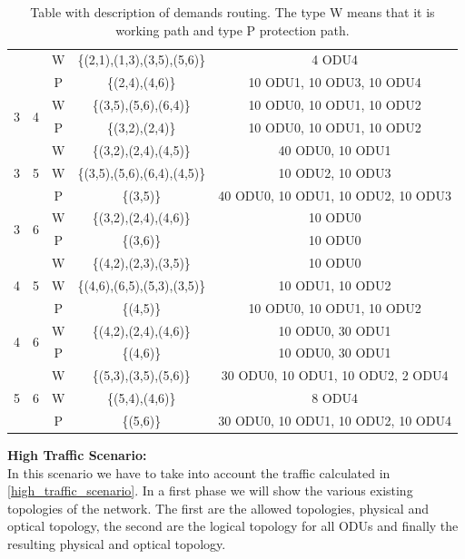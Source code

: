 \begin{table}[h]
\begin{tabular}{||c|c|c|c|c||}
  & &W& \{(2,1),(1,3),(3,5),(5,6)\} & 4 ODU4 \\
  & &P& \{(2,4),(4,6)\} & 10 ODU1, 10 ODU3, 10 ODU4 \\ \hline
 \multirow{2}{*}{3} & \multirow{2}{*}{4}&W& \{(3,5),(5,6),(6,4)\} & 10 ODU0, 10 ODU1, 10 ODU2 \\
  & &P& \{(3,2),(2,4)\} & 10 ODU0, 10 ODU1, 10 ODU2 \\ \hline
 \multirow{3}{*}{3}&\multirow{3}{*}{5}&W&\{(3,2),(2,4),(4,5)\}&40 ODU0, 10 ODU1 \\
  & &W& \{(3,5),(5,6),(6,4),(4,5)\}& 10 ODU2, 10 ODU3\\
  & &P& \{(3,5)\} & 40 ODU0, 10 ODU1, 10 ODU2, 10 ODU3 \\ \hline
 \multirow{2}{*}{3} & \multirow{2}{*}{6}&W& \{(3,2),(2,4),(4,6)\} & 10 ODU0 \\
  & &P& \{(3,6)\} & 10 ODU0 \\ \hline
 \multirow{3}{*}{4} & \multirow{3}{*}{5}&W& \{(4,2),(2,3),(3,5)\} & 10 ODU0 \\
  & &W& \{(4,6),(6,5),(5,3),(3,5)\} & 10 ODU1, 10 ODU2 \\
  & &P& \{(4,5)\} & 10 ODU0, 10 ODU1, 10 ODU2 \\ \hline
 \multirow{2}{*}{4} & \multirow{2}{*}{6}&W& \{(4,2),(2,4),(4,6)\} & 10 ODU0, 30 ODU1\\
  & &P& \{(4,6)\} & 10 ODU0, 30 ODU1\\ \hline
 \multirow{3}{*}{5} & \multirow{3}{*}{6}&W&\{(5,3),(3,5),(5,6)\}& 30 ODU0, 10 ODU1, 10 ODU2, 2 ODU4 \\
  & &W& \{(5,4),(4,6)\} & 8 ODU4 \\
  & &P& \{(5,6)\}& 30 ODU0, 10 ODU1, 10 ODU2, 10 ODU4 \\ \hline
\end{tabular}
\caption{Table with description of demands routing. The type W means that it is working path and type P protection path.}
\label{path_transluc_protec_ref_medium}
\end{table}

\newpage
\newpage
\newpage
\newpage
\textbf{High Traffic Scenario:}\\

In this scenario we have to take into account the traffic calculated in \ref{high_traffic_scenario}. In a first phase we will show the various existing topologies of the network. The first are the allowed topologies, physical and optical topology, the second are the logical topology for all ODUs and finally the resulting physical and optical topology.

